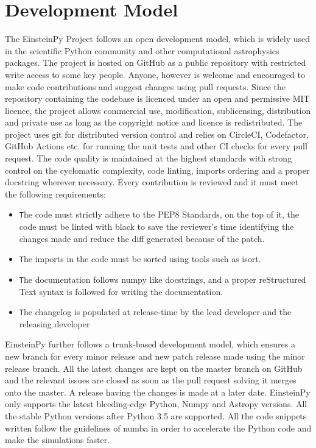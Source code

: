 \documentclass{aastex63}
\begin{document}
\section{Development Model} \label{sec:devmodels}
The EinsteinPy Project follows an open development model, which is widely used in the scientific Python community and other computational astrophysics packages. The project is hosted on GitHub as a public repository with restricted write access to some key people. Anyone, however is welcome and encouraged to make code contributions and suggest changes using pull requests. Since the repository containing the codebase is licenced under an open and permissive MIT licence,  the project allows commercial use, modification, sublicensing, distribution and private use as long as the copyright notice and licence is redistributed. The project uses git for distributed version control and relies on CircleCI, Codefactor, GitHub Actions etc. for running the unit tests and other CI checks for every pull request.
The code quality is maintained at the highest standards with strong control on the cyclomatic complexity, code linting, imports ordering and a proper docstring wherever necessary. Every contribution is reviewed and it must meet the following requirements: 

\begin{itemize}
\item \texttt The code must strictly adhere to the PEP8 Standards, on the top of it, the code must be linted with black to save the reviewer’s time identifying the changes made and reduce the diff generated because of the patch.
\item \texttt The imports in the code must be sorted using tools such as isort. 
\item \texttt The documentation follows numpy like docstrings, and a proper reStructured Text syntax is followed for writing the documentation.
\item \texttt The changelog is populated at release-time by the lead developer and the releasing developer
\end{itemize}
EinsteinPy further follows a trunk-based development model, which ensures a new branch for every minor release and new patch release made using the minor release branch. All the latest changes are kept on the master branch on GitHub and the relevant issues are closed as soon as the pull request solving it merges onto the master. A release having the changes is made at a later date. 
EinsteinPy only supports the latest bleeding-edge Python, Numpy and Astropy versions.  All the stable Python versions after Python 3.5 are supported. All the code snippets written follow the guidelines of numba in order to accelerate the Python code and make the simulations faster. 
\end{document}
